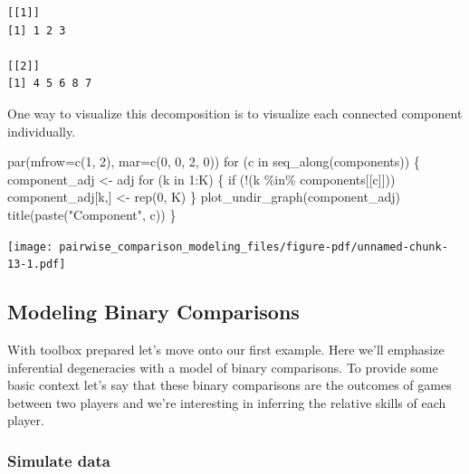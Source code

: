 \documentclass[
  letterpaper,
  DIV=11,
  numbers=noendperiod]{scrartcl}
\newenvironment{Shaded}{\begin{snugshade}}{\end{snugshade}}
\newcommand{\AttributeTok}[1]{\textcolor[rgb]{0.40,0.45,0.13}{#1}}
\newcommand{\ControlFlowTok}[1]{\textcolor[rgb]{0.00,0.23,0.31}{#1}}
\newcommand{\DecValTok}[1]{\textcolor[rgb]{0.68,0.00,0.00}{#1}}
\newcommand{\FunctionTok}[1]{\textcolor[rgb]{0.28,0.35,0.67}{#1}}
\newcommand{\NormalTok}[1]{\textcolor[rgb]{0.00,0.23,0.31}{#1}}
\newcommand{\OtherTok}[1]{\textcolor[rgb]{0.00,0.23,0.31}{#1}}
\newcommand{\SpecialCharTok}[1]{\textcolor[rgb]{0.37,0.37,0.37}{#1}}
\newcommand{\StringTok}[1]{\textcolor[rgb]{0.13,0.47,0.30}{#1}}
\begin{document}
\begin{verbatim}
[[1]]
[1] 1 2 3

[[2]]
[1] 4 5 6 8 7
\end{verbatim}

One way to visualize this decomposition is to visualize each connected
component individually.

\begin{Shaded}
\begin{Highlighting}[]
\FunctionTok{par}\NormalTok{(}\AttributeTok{mfrow=}\FunctionTok{c}\NormalTok{(}\DecValTok{1}\NormalTok{, }\DecValTok{2}\NormalTok{), }\AttributeTok{mar=}\FunctionTok{c}\NormalTok{(}\DecValTok{0}\NormalTok{, }\DecValTok{0}\NormalTok{, }\DecValTok{2}\NormalTok{, }\DecValTok{0}\NormalTok{))}
\ControlFlowTok{for}\NormalTok{ (c }\ControlFlowTok{in} \FunctionTok{seq\_along}\NormalTok{(components)) \{}
\NormalTok{  component\_adj }\OtherTok{\textless{}{-}}\NormalTok{ adj}
  \ControlFlowTok{for}\NormalTok{ (k }\ControlFlowTok{in} \DecValTok{1}\SpecialCharTok{:}\NormalTok{K) \{}
    \ControlFlowTok{if}\NormalTok{ (}\SpecialCharTok{!}\NormalTok{(k }\SpecialCharTok{\%in\%}\NormalTok{ components[[c]]))}
\NormalTok{      component\_adj[k,] }\OtherTok{\textless{}{-}} \FunctionTok{rep}\NormalTok{(}\DecValTok{0}\NormalTok{, K)}
\NormalTok{  \}}
  \FunctionTok{plot\_undir\_graph}\NormalTok{(component\_adj)}
  \FunctionTok{title}\NormalTok{(}\FunctionTok{paste}\NormalTok{(}\StringTok{"Component"}\NormalTok{, c))}
\NormalTok{\}}
\end{Highlighting}
\end{Shaded}

\texttt{[image: pairwise\_comparison\_modeling\_files/figure-pdf/unnamed-chunk-13-1.pdf]}

\subsection{Modeling Binary
Comparisons}\label{modeling-binary-comparisons}

With toolbox prepared let's move onto our first example. Here we'll
emphasize inferential degeneracies with a model of binary comparisons.
To provide some basic context let's say that these binary comparisons
are the outcomes of games between two players and we're interesting in
inferring the relative skills of each player.

\subsubsection{Simulate data}\label{simulate-data}
\end{document}
